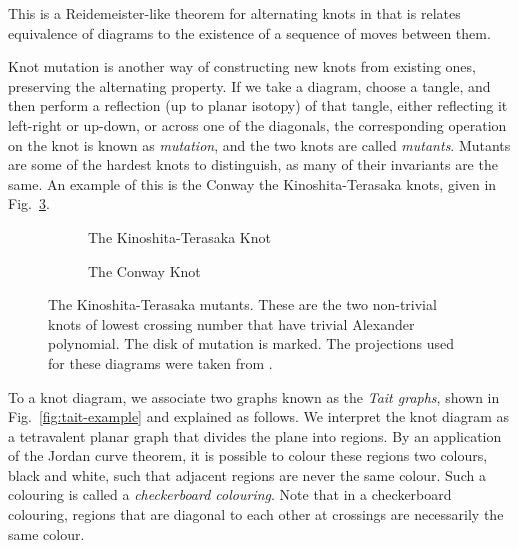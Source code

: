 \documentclass[12pt]{report}
\begin{document}
This is a Reidemeister-like theorem for alternating knots in that is relates equivalence of diagrams to the existence of a sequence of moves between them.

Knot mutation is another way of constructing new knots from existing ones, preserving the alternating property. If we take a diagram, choose a tangle, and then perform a reflection (up to planar isotopy) of that tangle, either reflecting it left-right or up-down, or across one of the diagonals, the corresponding operation on the knot is known as \textit{mutation}, and the two knots are called \textit{mutants}. Mutants are some of the hardest knots to distinguish, as many of their invariants are the same. An example of this is the Conway the Kinoshita-Terasaka knots, given in Fig.~\ref{fig:kinoshita-terasaka-mutants}.

\begin{figure}[hbt!]
	\centering
	\hspace*{\fill}
	\begin{subfigure}[b]{0.4 \textwidth}
		\centering
		\def\svgscale{0.25}
		
		\caption{The Kinoshita-Terasaka Knot}
		\label{fig:kinoshita-terasaka-knot}
	\end{subfigure}
	\hspace*{\fill} \hspace*{\fill}	\hspace*{\fill}
	\begin{subfigure}[b]{0.4 \textwidth}
		\centering
		\def\svgscale{0.25}
		
		\caption{The Conway Knot}
		\label{fig:conway-knot}
	\end{subfigure}
	\hspace*{\fill} 
	\caption{The Kinoshita-Terasaka mutants. These are the two non-trivial knots of lowest crossing number that have trivial Alexander polynomial. The disk of mutation is marked. The projections used for these diagrams were taken from \cite[Fig.~2.32]{the-knot-book}.}
	\label{fig:kinoshita-terasaka-mutants}
\end{figure}

To a knot diagram, we associate two graphs known as the \textit{Tait graphs}, shown in Fig.~\ref{fig:tait-example} and explained as follows. We interpret the knot diagram as a tetravalent planar graph that divides the plane into regions. By an application of the Jordan curve theorem, it is possible to colour these regions two colours, black and white, such that adjacent regions are never the same colour. Such a colouring is called a \textit{checkerboard colouring}. Note that in a checkerboard colouring, regions that are diagonal to each other at crossings are necessarily the same colour.
\end{document}
